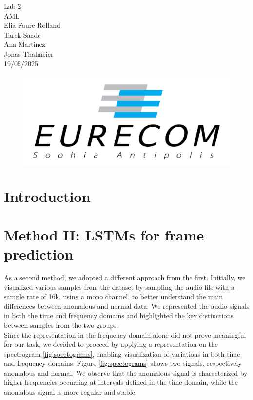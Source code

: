 \documentclass[ngerman]{scrartcl}
\begin{document}
\begin{titlepage}
\begin{center}
    \vspace{15cm}
    \huge{Lab 2}\\
    \vspace{2cm}
    \Huge{AML}\\
    \vspace{2cm}
    \Large{Elia Faure-Rolland}\\
    \Large{Tarek Saade}\\
    \Large{Ana Martinez}\\
    \Large{Jonas Thalmeier}\\
    \vspace{1cm}
    19/05/2025
\end{center}
\vspace{3cm}
\begin{figure}[h]
    \centering
    \includegraphics[width=.5\textwidth]{Figures/Eurecom.png}
\end{figure}
\end{titlepage}

\thispagestyle{empty}
\newpage
\setcounter{page}{1}

\section{Introduction}




\section{Method II: LSTMs for frame prediction}

As a second method, we adopted a different approach from the first. 
Initially, we visualized various samples from the dataset by sampling the audio file with a sample rate of 16k, using a mono channel, to better understand the main differences between anomalous and normal data. 
We represented the audio signals in both the time and frequency domains and highlighted the key distinctions between samples from the two groups.
\\Since the representation in the frequency domain alone did not prove meaningful for our task, we decided to proceed by applying a representation on the spectrogram \ref{fig:spectograms},
 enabling visualization of variations in both time and frequency domains. Figure \ref{fig:spectograms} shows two signals, respectively anomalous and normal. 
 We observe that the anomalous signal is characterized by higher frequencies occurring at intervals defined in the time domain, while the anomalous signal is more regular and stable.
\end{document}
